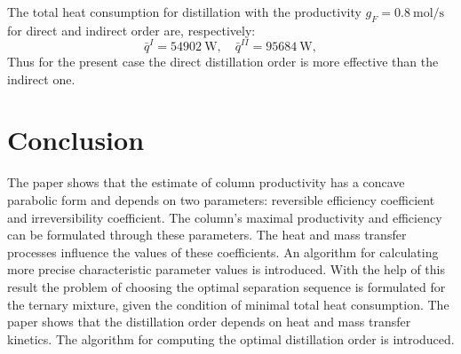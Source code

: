 \documentclass[12pt]{article}
\begin{document}
The total heat consumption for distillation with the productivity $g_F = 0.8\:\mbox{mol/s}$ for direct and indirect order are, respectively:
$$
\bar{q}^I = 54902\:\mbox{W},\quad \bar{q}^{II} = 95684 \:\mbox{W},
$$
Thus for the present case the direct distillation order is more effective than the indirect one.


\section {Conclusion}
The paper shows that the estimate of column productivity has a concave parabolic form and depends on two parameters: reversible efficiency coefficient and irreversibility coefficient. The column's maximal productivity and efficiency can be formulated through these parameters. The heat and mass transfer processes influence the values of these coefficients. An algorithm for calculating more precise characteristic parameter values is introduced.
With the help of this result the problem of choosing the optimal separation sequence  is formulated for the ternary mixture, given the condition of minimal total heat consumption. The paper shows that the distillation order depends on heat and mass transfer kinetics. The algorithm for computing the optimal distillation order is introduced.



\newpage
\end{document}
